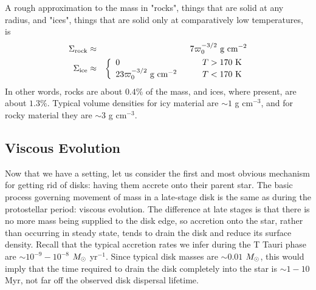 A rough approximation to the mass in "rocks", things that are solid at any radius, and "ices", things that are solid only at comparatively low temperatures, is
\begin{eqnarray}
\Sigma_{\rm rock} & \approx & 7 \varpi_0^{-3/2}\mbox{ g cm}^{-2} \\
\Sigma_{\rm ice} & \approx &
\left\{
\begin{array}{ll}
0 & T > 170\mbox{ K}\\
23\varpi_0^{-3/2}\mbox{ g cm}^{-2} \qquad & T < 170\mbox{ K}
\end{array}
\right.
\end{eqnarray}
In other words, rocks are about $0.4\%$ of the mass, and ices, where present, are about $1.3\%$. Typical volume densities for icy material are $\sim 1$ g cm$^{-3}$, and for rocky material they are $\sim 3$ g cm$^{-3}$.

\subsection{Viscous Evolution}

Now that we have a setting, let us consider the first and most obvious mechanism for getting rid of disks: having them accrete onto their parent star. The basic process governing movement of mass in a late-stage disk is the same as during the protostellar period: viscous evolution. The difference at late stages is that there is no more mass being supplied to the disk edge, so accretion onto the star, rather than occurring in steady state, tends to drain the disk and reduce its surface density. Recall that the typical accretion rates we infer during the T Tauri phase are $\sim 10^{-9}-10^{-8}$ $M_{\odot}$ yr$^{-1}$. Since typical disk masses are $\sim 0.01$ $M_{\odot}$, this would imply that the time required to drain the disk completely into the star is $\sim 1 - 10$ Myr, not far off the observed disk dispersal lifetime.

